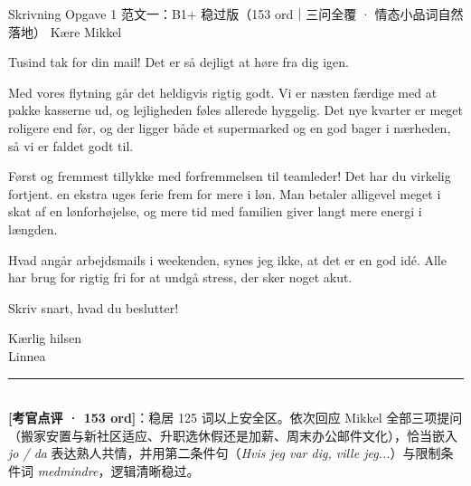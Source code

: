 \begin{emailbox}{Skrivning Opgave 1 范文一：B1+ 稳过版（153 ord｜三问全覆 · 情态小品词自然落地）}
Kære Mikkel

\vspace{0.25em}
Tusind tak for din mail! Det er  så dejligt at høre fra dig igen.

\vspace{0.25em}
Med vores flytning går det heldigvis rigtig godt. Vi er næsten færdige med at pakke kasserne ud, og lejligheden føles allerede hyggelig. Det nye kvarter er meget roligere end før, og der ligger både et supermarked og en god bager i nærheden, så vi er faldet godt til.

\vspace{0.25em}
Først og fremmest tillykke med forfremmelsen til teamleder! Det har du  virkelig fortjent.  en ekstra uges ferie frem for mere i løn. Man betaler  alligevel meget i skat af en lønforhøjelse, og mere tid med familien giver langt mere energi i længden.

\vspace{0.25em}
Hvad angår arbejdsmails i weekenden, synes jeg ikke, at det er en god idé. Alle har brug for rigtig fri for at undgå stress,  der sker noget akut.

\vspace{0.25em}
Skriv snart, hvad du beslutter!

\vspace{0.25em}
Kærlig hilsen\\
Linnea

\vspace{0.3em}
\rule{\linewidth}{0.4pt}\\[0.2em]
\small\textbf{\color{NCDTeal}[考官点评 · 153 ord]}：稳居 125 词以上安全区。依次回应 Mikkel 全部三项提问（搬家安置与新社区适应、升职选休假还是加薪、周末办公邮件文化），恰当嵌入 \textit{jo / da} 表达熟人共情，并用第二条件句（\textit{Hvis jeg var dig, ville jeg...}）与限制条件词 \textit{medmindre}，逻辑清晰稳过。
\end{emailbox}

